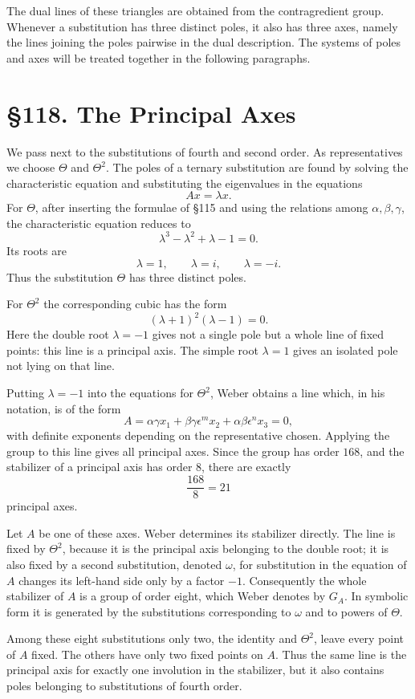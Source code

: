 \documentclass[12pt,a4paper]{article}
\newcommand{\webersection}[2]{\clearpage\section*{\S #1. #2}\addcontentsline{toc}{section}{\S #1. #2}}
\begin{document}
The dual lines of these triangles are obtained from the contragredient group.  Whenever a substitution has three distinct poles, it also has three axes, namely the lines joining the poles pairwise in the dual description.  The systems of poles and axes will be treated together in the following paragraphs.

\webersection{118}{The Principal Axes}

We pass next to the substitutions of fourth and second order.  As representatives we choose \(\Theta\) and \(\Theta^2\).  The poles of a ternary substitution are found by solving the characteristic equation and substituting the eigenvalues in the equations
\[
 A x = \lambda x.
\]
For \(\Theta\), after inserting the formulae of \S 115 and using the relations among \(\alpha,\beta,\gamma\), the characteristic equation reduces to
\[
 \lambda^3-\lambda^2+\lambda-1=0.
\]
Its roots are
\[
 \lambda=1,
\qquad \lambda=i,
\qquad \lambda=-i.
\]
Thus the substitution \(\Theta\) has three distinct poles.

For \(\Theta^2\) the corresponding cubic has the form
\[
 (\lambda+1)^2(\lambda-1)=0.
\]
Here the double root \(\lambda=-1\) gives not a single pole but a whole line of fixed points: this line is a principal axis.  The simple root \(\lambda=1\) gives an isolated pole not lying on that line.

Putting \(\lambda=-1\) into the equations for \(\Theta^2\), Weber obtains a line which, in his notation, is of the form
\[
 A=\alpha\gamma x_1+\beta\gamma\epsilon^{m}x_2+
    \alpha\beta\epsilon^{n}x_3=0,
\]
with definite exponents depending on the representative chosen.  Applying the group to this line gives all principal axes.  Since the group has order \(168\), and the stabilizer of a principal axis has order \(8\), there are exactly
\[
 \frac{168}{8}=21
\]
principal axes.

Let \(A\) be one of these axes.  Weber determines its stabilizer directly.  The line is fixed by \(\Theta^2\), because it is the principal axis belonging to the double root; it is also fixed by a second substitution, denoted \(\omega\), for substitution in the equation of \(A\) changes its left-hand side only by a factor \(-1\).  Consequently the whole stabilizer of \(A\) is a group of order eight, which Weber denotes by \(G_A\).  In symbolic form it is generated by the substitutions corresponding to \(\omega\) and to powers of \(\Theta\).

Among these eight substitutions only two, the identity and \(\Theta^2\), leave every point of \(A\) fixed.  The others have only two fixed points on \(A\).  Thus the same line is the principal axis for exactly one involution in the stabilizer, but it also contains poles belonging to substitutions of fourth order.
\end{document}
